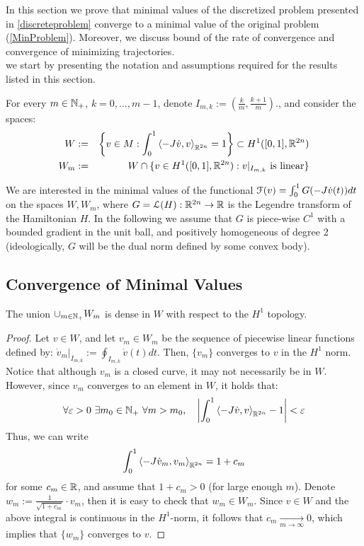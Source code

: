 \documentclass[../capacities_main.tex]{subfiles}
\begin{document}


In this section we prove that minimal values of the discretized problem presented in \autoref{discreteproblem} converge to a minimal value of the original problem (\ref{MinProblem}). Moreover, we discuss bound of the rate of convergence and convergence of minimizing trajectories.\\


we start by presenting the notation and assumptions required for the results listed in this section. 
\begin{Definition}
	
	For every $m\in{\mathbb N}_+$, $k=0,\dots,m-1$, denote $I_{m,k}:=(\frac{k}{m},\frac{k+1}{m})$., and consider the spaces:
	\begin{eqnarray*}
		W &:=& \left\{v\in M: \int_0^1\left<-J\dot v,v\right>_{{\mathbb R}^{2n}}=1\right\}\subset H^1([0,1],{\mathbb R}^{2n})\\
		W_m &:=& W\cap\{v\in H^1([0,1],{\mathbb R}^{2n}):\text{$v|_{I_{m,k}}$ is linear}\}
	\end{eqnarray*}
	
\end{Definition}
We are interested in the minimal values of the functional ${\mathcal F}(v)=\int_0^1 G(-J\dot v(t))dt$ on the spaces $W,W_m$, where $G=\mathcal L(H):{\mathbb R}^{2n}\rightarrow {\mathbb R}$ is the Legendre transform of the Hamiltonian $H$. In the following we assume that $G$ is piece-wise $C^1$ with a bounded gradient in the unit ball, and positively homogeneous of degree 2 (ideologically, $G$ will be the dual norm defined by some convex body).  

\subsection{Convergence of Minimal Values}


\begin{Lemma}\label{Lemma:dense}
	The union $\cup_{m\in{\mathbb N}_+} W_m$ is dense in $W$ with respect to the $H^1$ topology.
\end{Lemma}
\begin{proof}
	Let $v\in W$, and let  $v_m\in W_m$ be the sequence of piecewise linear functions defined by: $\dot v_m|_{I_{m,k}}:=\oint_{I_{m,k}} \dot v(t)dt$. Then, $\{v_m\}$ converges to $v$ in the $H^1$ norm. Notice that although $v_m$ is a closed curve, it may not necessarily be in $W$. However, since $v_m$ converges to an element in $W$, it holds that:
	\[
	\forall {\varepsilon}>0\ \exists m_0\in{\mathbb N}_+\ \forall m>m_0, \quad \left|\int_0^1\left<-J\dot v,v\right>_{{\mathbb R}^{2n}}-1\right|<{\varepsilon}
	\] 
	Thus, we can write
	\[
	\int_0^1\left<-J\dot v_m,v_m\right>_{{\mathbb R}^{2n}}=1+c_m
	\]
	for some $c_m\in{\mathbb R}$, and assume that $1+c_m>0$ (for large enough $m$). Denote $w_m:=\frac{1}{\sqrt{1+c_m}}\cdot v_m$, then it is easy to check that $w_m\in W_m$. Since $v\in W$ and the above integral is continuous in the $H^1$-norm, it follows that $c_m\underset{m\rightarrow\infty}{\longrightarrow} 0$, which implies that $\{w_m\}$ converges to $v$. 	
	
\end{proof}\
\end{document}
